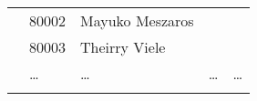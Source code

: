 \begin{table}[!htbp]
\begin{tabular} {c | l l l l  }
 & 80002 & Mayuko Meszaros & & \\
 & 80003 & Theirry Viele & & \\
&\ldots & \ldots  & \ldots & \ldots \\
\arrayrulecolor{white}\hline
\end{tabular}
%
%
\end{table}

